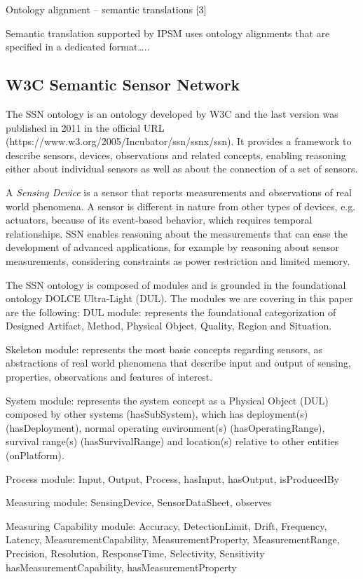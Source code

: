 \documentclass{sig-alternate-05-2015}
\begin{document}
Ontology alignment – semantic translations [3]

Semantic translation supported by IPSM uses ontology alignments that are specified in a dedicated format….. 


\subsection{W3C Semantic Sensor Network}
The SSN ontology is an ontology developed by W3C and the last version was published in 2011 in the official URL (https://www.w3.org/2005/Incubator/ssn/ssnx/ssn). It provides a framework to describe sensors, devices, observations and related concepts, enabling reasoning either about individual sensors as well as about the connection of a set of sensors. 

A \textit{Sensing Device} is a sensor that reports measurements and observations of real world phenomena. A sensor is different in nature from other types of devices, e.g. actuators, because of its event-based behavior, which requires temporal relationships. SSN enables reasoning about the measurements that can ease the development of advanced applications, for example by reasoning about sensor measurements, considering constraints as power restriction and limited memory. 

The SSN ontology is composed of modules and is grounded in the foundational ontology DOLCE Ultra-Light (DUL). The modules we are covering in this paper are the following:
DUL module: represents the foundational categorization of Designed Artifact, Method, Physical Object, Quality, Region and Situation.  

Skeleton module: represents the most basic concepts regarding sensors, as abstractions of real world phenomena that describe input and output of sensing, properties, observations and features of interest.

System module: represents the system concept as a Physical Object (DUL) composed by other systems (hasSubSystem), which has deployment(s) (hasDeployment), normal operating environment(s) (hasOperatingRange), survival range(s) (hasSurvivalRange) and location(s) relative to other entities (onPlatform).

Process module: Input, Output, Process, hasInput, hasOutput, isProducedBy

Measuring module: SensingDevice, SensorDataSheet, observes

Measuring Capability module: Accuracy, DetectionLimit, Drift, Frequency, Latency, MeasurementCapability, MeasurementProperty, MeasurementRange, Precision, Resolution, ResponseTime, Selectivity, Sensitivity	hasMeasurementCapability, hasMeasurementProperty
\end{document}
